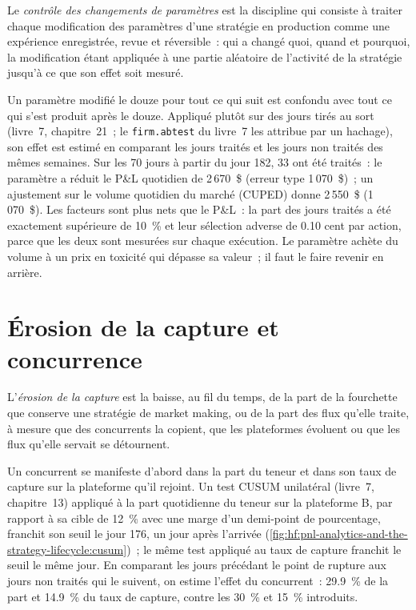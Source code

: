 \begin{definition}\label{def:hf:pnl-analytics-and-the-strategy-lifecycle:control}
Le \emph{contrôle des changements de paramètres} est la discipline qui consiste à traiter chaque modification des paramètres d'une stratégie en production comme une
expérience enregistrée, revue et réversible~: qui a changé quoi, quand et pourquoi, la modification étant appliquée à une partie aléatoire de l'activité de la stratégie
jusqu'à ce que son effet soit mesuré.
\end{definition}

Un paramètre modifié le douze pour tout ce qui suit est confondu avec tout ce qui s'est produit après le douze. Appliqué
plutôt sur des jours tirés au sort (livre~7, chapitre~21~; le \texttt{firm.abtest} du livre~7 les attribue par un hachage), son effet est estimé en comparant
les jours traités et les jours non traités des mêmes semaines. Sur les 70 jours à partir du jour 182, 33 ont été traités~: le paramètre a réduit le P\&L quotidien de 2\,670~\$ (erreur type
1\,070~\$)~; un ajustement sur le volume quotidien du marché (CUPED) donne 2\,550~\$ (1\,070~\$). Les facteurs sont plus nets que le P\&L~: la part des jours traités
a été exactement supérieure de 10~\% et leur sélection adverse de 0.10 cent par action, parce que les deux sont mesurées sur chaque exécution. Le paramètre achète du volume à un
prix en toxicité qui dépasse sa valeur~; il faut le faire revenir en arrière.

\section{Érosion de la capture et concurrence}

\begin{definition}\label{def:hf:pnl-analytics-and-the-strategy-lifecycle:decay}
L'\emph{érosion de la capture} est la baisse, au fil du temps, de la part de la fourchette que conserve une stratégie de market making, ou de la part
des flux qu'elle traite, à mesure que des concurrents la copient, que les plateformes évoluent ou que les flux qu'elle servait se détournent.
\end{definition}

Un concurrent se manifeste d'abord dans la part du teneur et dans son taux de capture sur la plateforme qu'il rejoint. Un test CUSUM unilatéral (livre~7, chapitre~13) appliqué
à la part quotidienne du teneur sur la plateforme B, par rapport à sa cible de 12~\% avec une marge d'un demi-point de pourcentage, franchit son seuil le jour 176, un jour après l'arrivée
(\cref{fig:hf:pnl-analytics-and-the-strategy-lifecycle:cusum})~; le même test appliqué au taux de capture franchit le seuil le même jour. En comparant les jours précédant
le point de rupture aux jours non traités qui le suivent, on estime l'effet du concurrent~: 29.9~\% de la part et 14.9~\% du taux de capture, contre les
30~\% et 15~\% introduits.

